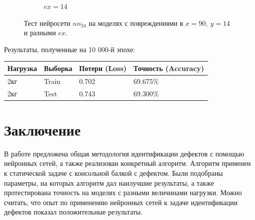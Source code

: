 \documentclass[a4paper,12pt]{article}
\theoremstyle{remark}
\begin{document}
\begin{figure}[h]
\begin{subfigure}{0.33\textwidth}
			\caption{$ex=14$}
		\end{subfigure}
		\caption{Тест нейросети $nn_{24}$ на моделях с повреждениями в $x=90,\ y=14$ и разными $ex$.}
		\label{fig:nn3_damage_90_14}
	\end{figure}

	Результаты, полученные на 10 000-й эпохе: \\
	
	\begin{tabular}{| l | l | l | l |}
		\hline
		Нагрузка & Выборка & Потери (Loss) & Точность (Accuracy) \\
		\hline
		2кг & Train & 0.702 & 69.675\% \\
		\hline
		2кг & Test & 0.743 & 69.300\% \\
		\hline
	\end{tabular}
	
	\newpage
	\section{Заключение}
	
	
	В работе предложена общая методология идентификации дефектов с помощью нейронных сетей, а также реализован конкретный алгоритм. Алгоритм применен к статической задаче с консольной балкой с дефектом. Были подобраны параметры, на которых алгоритм дал наилучшие результаты, а также протестирована точность на моделях с разными величинами нагрузки. Можно считать, что опыт по применению нейронных сетей к задаче идентификации дефектов показал положительные результаты.
	
\end{document}
